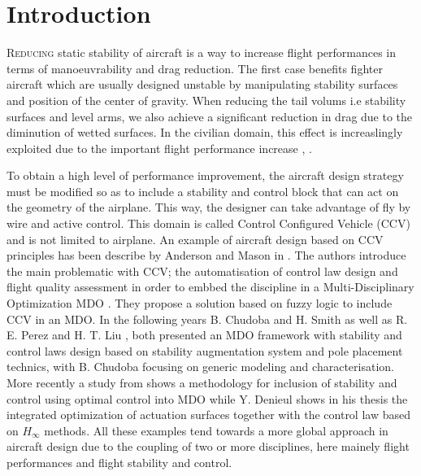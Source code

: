  \section{Introduction}
\lettrine{R}{educing} static stability of aircraft is a way to increase flight performances in terms of manoeuvrability and drag reduction. The first case benefits fighter aircraft which are usually designed unstable by manipulating stability surfaces and position of the center of gravity. When reducing the tail volums i.e stability surfaces and level arms, we also achieve a significant reduction in drag due to the diminution of wetted surfaces. In the civilian domain, this effect is increaslingly exploited due to the important flight performance increase \cite{HermanImpactControlConceptonDesign}, \cite{Abzug}.

To obtain a high level of performance improvement, the aircraft design strategy must be modified so as to include a stability and control block that can act on the geometry of the airplane. This way, the designer can take advantage of fly by wire and active control. This domain is called Control Configured Vehicle (CCV) and is not limited to airplane\cite{Abzug}. An example of aircraft design based on CCV principles has been describe by Anderson and Mason in \cite{Anderson_CCV_design}. The authors introduce the main problematic with CCV; the automatisation of control law design and flight quality assessment in order to embbed the discipline in a Multi-Disciplinary Optimization MDO . They propose a solution based on fuzzy logic to include CCV in an MDO. In the following years B. Chudoba and H. Smith \cite{Chudoba_generic_method} as well as R. E. Perez and H. T. Liu \cite{LiuPerezMDOFramework}, both presented an MDO framework with stability and control laws design based on stability augmentation system and pole placement technics, with B. Chudoba focusing on generic modeling and characterisation. More recently a study from \cite{WelsteadConceptualDesignAugmentedStability} shows a methodology for inclusion of stability and control using optimal control into MDO while Y. Denieul \cite{YannDenieul} shows in his thesis the integrated optimization of actuation surfaces together with the control law based on $H_\infty$ methods. All these examples tend towards a more global approach in aircraft design due to the coupling of two or more disciplines, here mainely flight performances and flight stability and control.

